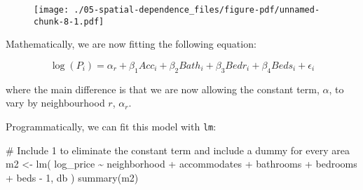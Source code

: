 \documentclass[
  letterpaper,
  krantz2]{style/krantz}
\newenvironment{Shaded}{\begin{snugshade}}{\end{snugshade}}
\newcommand{\CommentTok}[1]{\textcolor[rgb]{0.37,0.37,0.37}{#1}}
\newcommand{\FunctionTok}[1]{\textcolor[rgb]{0.28,0.35,0.67}{#1}}
\newcommand{\NormalTok}[1]{\textcolor[rgb]{0.00,0.23,0.31}{#1}}
\newcommand{\OtherTok}[1]{\textcolor[rgb]{0.00,0.23,0.31}{#1}}
\newcommand{\StringTok}[1]{\textcolor[rgb]{0.13,0.47,0.30}{#1}}
\begin{document}
\begin{figure}[H]

{\centering \texttt{[image: ./05-spatial-dependence\_files/figure-pdf/unnamed-chunk-8-1.pdf]}

}

\end{figure}

Mathematically, we are now fitting the following equation:

\[
\log(P_i) = \alpha_r + \beta_1 Acc_i + \beta_2 Bath_i + \beta_3 Bedr_i + \beta_4 Beds_i + \epsilon_i
\]

where the main difference is that we are now allowing the constant term,
\(\alpha\), to vary by neighbourhood \(r\), \(\alpha_r\).

Programmatically, we can fit this model with \texttt{lm}:

\begin{Shaded}
\begin{Highlighting}[]
\CommentTok{\# Include \textasciigrave{}{-}1\textasciigrave{} to eliminate the constant term and include a dummy for every area}
\NormalTok{m2 }\OtherTok{\textless{}{-}} \FunctionTok{lm}\NormalTok{(}
  \StringTok{\textquotesingle{}log\_price \textasciitilde{} neighborhood + accommodates + bathrooms + bedrooms + beds {-} 1\textquotesingle{}}\NormalTok{, }
\NormalTok{  db}
\NormalTok{)}
\FunctionTok{summary}\NormalTok{(m2)}
\end{Highlighting}
\end{Shaded}
\end{document}
